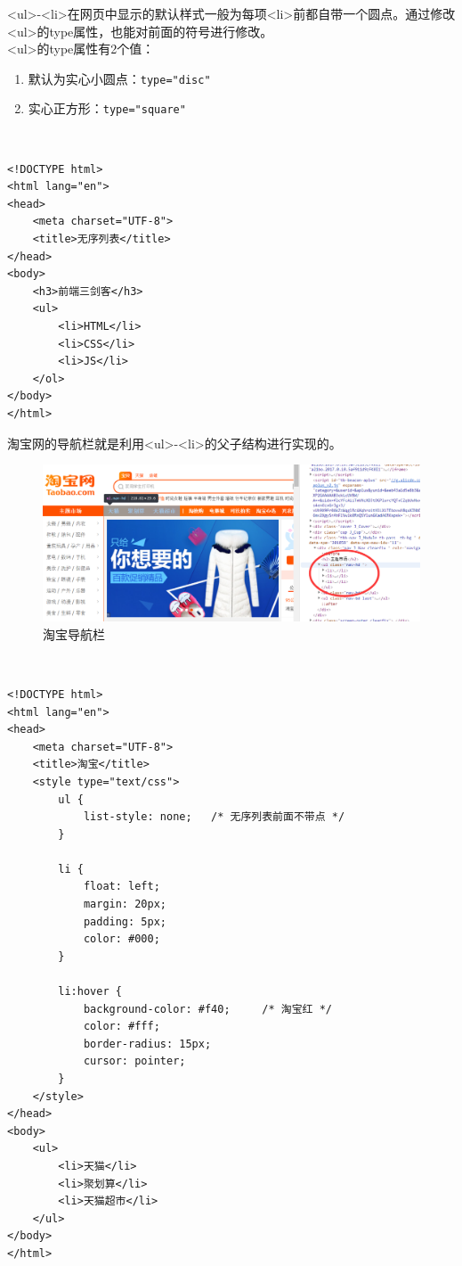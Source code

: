 <ul>-<li>在网页中显示的默认样式一般为每项<li>前都自带一个圆点。通过修改<ul>的type属性，也能对前面的符号进行修改。 \\

<ul>的type属性有2个值：

\begin{enumerate}
	\item 默认为实心小圆点：\lstinline|type="disc"|
	\item 实心正方形：\lstinline|type="square"|
\end{enumerate}

 \\
\begin{lstlisting}[style=htmlcssjs]
<!DOCTYPE html>
<html lang="en">
<head>
    <meta charset="UTF-8">
    <title>无序列表</title>
</head>
<body>
    <h3>前端三剑客</h3>
    <ul>
        <li>HTML</li>
        <li>CSS</li>
        <li>JS</li>
    </ol>
</body>
</html>
\end{lstlisting}

淘宝网的导航栏就是利用<ul>-<li>的父子结构进行实现的。

\begin{figure}[H]
	\centering
	\includegraphics[scale=0.5]{img/C3/3-2/2.png}
	\caption{淘宝导航栏}
\end{figure}

 \\
\begin{lstlisting}[style=htmlcssjs]
<!DOCTYPE html>
<html lang="en">
<head>
    <meta charset="UTF-8">
    <title>淘宝</title>
    <style type="text/css">
        ul {
            list-style: none;   /* 无序列表前面不带点 */
        }

        li {
            float: left;
            margin: 20px;
            padding: 5px;
            color: #000;
        }

        li:hover {
            background-color: #f40;     /* 淘宝红 */
            color: #fff;
            border-radius: 15px;
            cursor: pointer;
        }
    </style>
</head>
<body>
    <ul>
        <li>天猫</li>
        <li>聚划算</li>
        <li>天猫超市</li>
    </ul>
</body>
</html>
\end{lstlisting}

